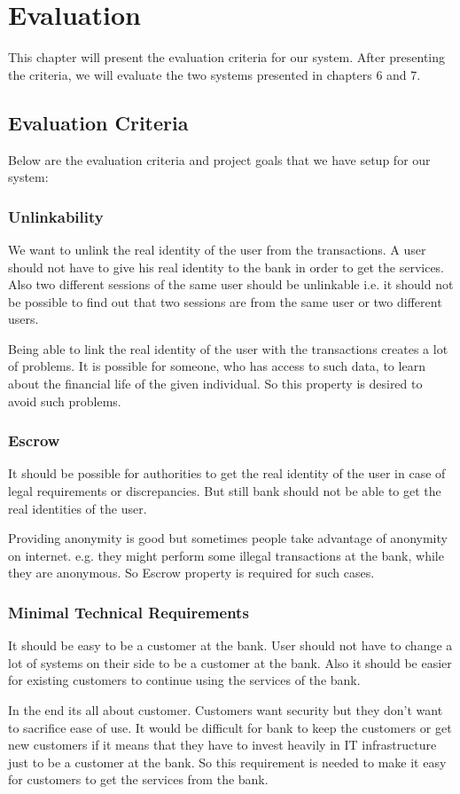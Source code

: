 \chapter{Evaluation}
This chapter will present the evaluation criteria for our system. After presenting the criteria, we will evaluate the two systems presented in chapters 6 and 7.
\section{Evaluation Criteria}
Below are the evaluation criteria and project goals that we have setup for our system:
\subsection{Unlinkability}
We want to unlink the real identity of the user from the transactions. A user should not have to give his real identity to the bank in order to get the services. Also two different sessions of the same user should be unlinkable i.e. it should not be possible to find out that two sessions are from the same user or two different users.

Being able to link the real identity of the user with the transactions creates a lot of problems. It is possible for someone, who has access to such data, to learn about the financial life of the given individual. So this property is desired to avoid such problems.
\subsection{Escrow}
It should be possible for authorities to get the real identity of the user in case of legal requirements or discrepancies. But still bank should not be able to get the real identities of the user.

Providing anonymity is good but sometimes people take advantage of anonymity on internet. e.g. they might perform some illegal transactions at the bank, while they are anonymous. So Escrow property is required for such cases.
\subsection{Minimal Technical Requirements}
It should be easy to be a customer at the bank. User should not have to change a lot of systems on their side to be a customer at the bank. Also it should be easier for existing customers to continue using the services of the bank.

In the end its all about customer. Customers want security but they don't want to sacrifice ease of use. It would be difficult for bank to keep the customers or get new customers if it means that they have to invest heavily in IT infrastructure just to be a customer at the bank. So this requirement is needed to make it easy for customers to get the services from the bank.
